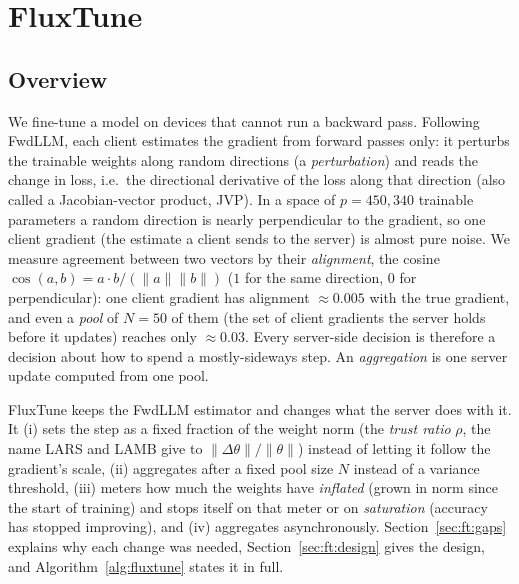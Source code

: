 \providecommand{\norm}[1]{\lVert #1\rVert}
\providecommand{\ttr}{\theta_{\mathrm{tr}}}
\providecommand{\E}{\mathbb{E}}
\newcommand{\figslot}[2]{\begin{figure}[t]\centering
  \fbox{\parbox{0.92\linewidth}{\centering\vspace{2.5em}\texttt{\detokenize{#1}}\vspace{2.5em}}}
  \caption{#2}\label{fig:#1}\end{figure}}

\section{FluxTune}
\label{sec:fluxtune}

\subsection{Overview}
\label{sec:ft:overview}
We fine-tune a model on devices that cannot run a backward pass. Following FwdLLM, each client estimates the gradient from forward passes only:
it perturbs the trainable weights along random directions (a \emph{perturbation}) and reads the change in loss, i.e.\ the directional derivative of the loss along that direction (also called a Jacobian-vector product, JVP). In a space of $p=450{,}340$ trainable parameters a random direction is
nearly perpendicular to the gradient, so one client gradient (the estimate a client sends to the server) is almost pure noise. We measure agreement between two vectors by their \emph{alignment}, the cosine $\cos(a,b)=a\!\cdot\! b/(\norm a\norm b)$ ($1$ for the same direction, $0$ for perpendicular): one client gradient has alignment $\approx0.005$ with the true gradient, and even a \emph{pool} of $N=50$ of them (the set of client gradients the server holds before it updates) reaches only $\approx0.03$.
Every server-side decision is therefore a decision about how to spend a mostly-sideways step. An \emph{aggregation} is one server update computed from one pool.

FluxTune keeps the FwdLLM estimator and changes what the server does with it. It (i) sets the step as a fixed fraction of the weight norm (the \emph{trust ratio} $\rho$, the name LARS and LAMB give to $\norm{\Delta\theta}/\norm{\theta}$) instead of
letting it follow the gradient's scale, (ii) aggregates after a fixed pool size $N$ instead of a variance threshold, (iii) meters how much the weights have \emph{inflated} (grown in norm since the start of training) and stops itself on that meter or on \emph{saturation} (accuracy has stopped improving),
and (iv) aggregates asynchronously. Section~\ref{sec:ft:gaps} explains why each change was needed, Section~\ref{sec:ft:design} gives the design, and Algorithm~\ref{alg:fluxtune} states it in full.

